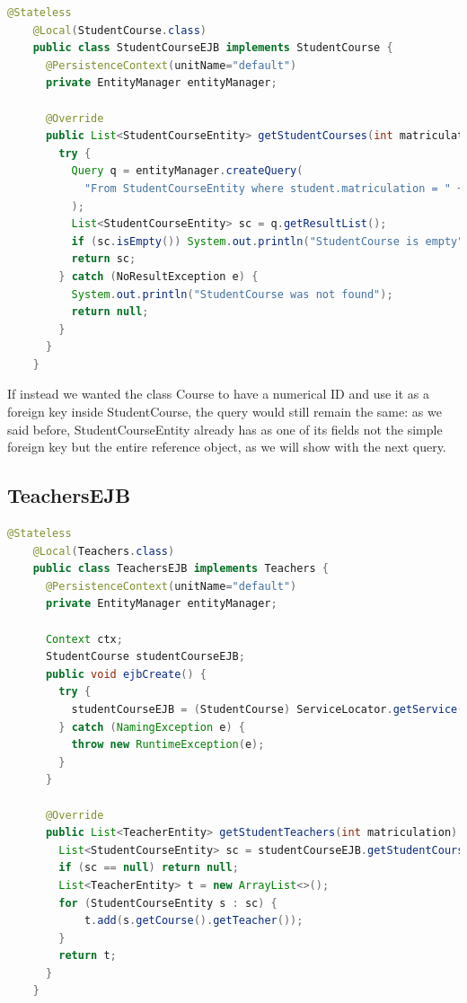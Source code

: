 \documentclass[12pt, a4paper]{article}
\begin{document}
  \begin{lstlisting}[language=java, caption={StudentCourseEJB}]
    @Stateless
    @Local(StudentCourse.class)
    public class StudentCourseEJB implements StudentCourse {
      @PersistenceContext(unitName="default")
      private EntityManager entityManager;

      @Override
      public List<StudentCourseEntity> getStudentCourses(int matriculation) {
        try {
          Query q = entityManager.createQuery(
            "From StudentCourseEntity where student.matriculation = " + matriculation
          );
          List<StudentCourseEntity> sc = q.getResultList();
          if (sc.isEmpty()) System.out.println("StudentCourse is empty");
          return sc;
        } catch (NoResultException e) {
          System.out.println("StudentCourse was not found");
          return null;
        }
      }
    }
  \end{lstlisting}

  If instead we wanted the class Course to have a numerical ID and use it as a foreign key inside StudentCourse, the query would still remain the same: as we said before, StudentCourseEntity already has as one of its fields not the simple foreign key but the entire reference object, as we will show with the next query.

  \subsection{TeachersEJB}

  \begin{lstlisting}[language=java, caption={TeachersEJB}]
    @Stateless
    @Local(Teachers.class)
    public class TeachersEJB implements Teachers {
      @PersistenceContext(unitName="default")
      private EntityManager entityManager;

      Context ctx;
      StudentCourse studentCourseEJB;
      public void ejbCreate() {
        try {
          studentCourseEJB = (StudentCourse) ServiceLocator.getService("java:module/StudentCourseEJB!it.marrocco.h2ejbdemo.ejb.StudentCourse");
        } catch (NamingException e) {
          throw new RuntimeException(e);
        }
      }

      @Override
      public List<TeacherEntity> getStudentTeachers(int matriculation) {
        List<StudentCourseEntity> sc = studentCourseEJB.getStudentCourses(matriculation);
        if (sc == null) return null;
        List<TeacherEntity> t = new ArrayList<>();
        for (StudentCourseEntity s : sc) {
            t.add(s.getCourse().getTeacher());
        }
        return t;
      }
    }
  \end{lstlisting}
\end{document}

